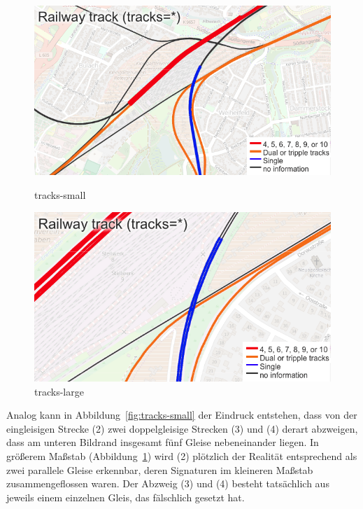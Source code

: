 \documentclass[../main/thesis.tex]{subfiles}
\begin{document}
\begin{figure}[ht]
  \begin{minipage}{.5\linewidth}
    \centering
    \includegraphics[width=\ScaleIfNeeded]{../chapter2/tracks-small}
    \caption{tracks-small}\label{fig:tracks-small}
  \end{minipage}%
  \begin{minipage}{.5\linewidth}
    \centering
    \includegraphics[width=\ScaleIfNeeded]{../chapter2/tracks-large}
    \caption{tracks-large}\label{fig:tracks-large}
  \end{minipage}
\end{figure}

Analog kann in Abbildung~\ref{fig:tracks-small} der Eindruck entstehen, dass von der eingleisigen Strecke (2) zwei doppelgleisige Strecken (3) und (4) derart abzweigen, dass am unteren Bildrand insgesamt fünf Gleise nebeneinander liegen. In größerem Maßstab (Abbildung~\ref{fig:tracks-large}) wird (2) plötzlich der Realität entsprechend als zwei parallele Gleise erkennbar, deren Signaturen im kleineren Maßstab zusammengeflossen waren. Der Abzweig (3) und (4) besteht tatsächlich aus jeweils einem einzelnen Gleis, das fälschlich  gesetzt hat.
\end{document}
